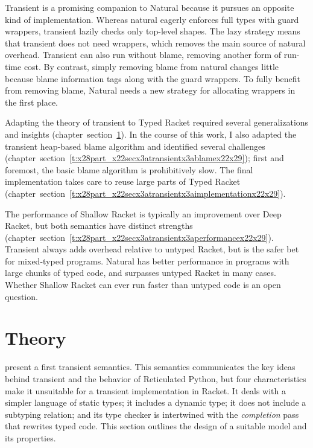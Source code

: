 \documentclass[ twoside,open=right,titlepage,numbers=noenddot,headinclude,%
                footinclude=true,cleardoublepage=empty,abstract=off,
                BCOR=5mm,paper=a4,fontsize=11pt,%
                ngerman,american,%
                parts,pdfspacing]{scrreprt}
\newcommand{\SecRef}[2]{section~#1}
\newcommand{\SecRefLocal}[3]{\hyperref[#1]{\SecRef{#2}{#3}}}
\let\SOriginalthesubsubsection\thesubsubsection
\newcommand{\Ssubsection}[2]{\subsection[#1]{#2}\let\thesubsubsection\SOriginalthesubsubsection}
\renewcommand{\Ssubsection}[2]{\section[#1]{#2}}
\renewcommand{\SecRefLocal}[3]{section~\ref{#1}}
\begin{document}
Transient is a promising companion to Natural because it pursues an
 opposite kind of implementation.
Whereas natural eagerly enforces full types with guard wrappers, transient
 lazily checks only top{-}level shapes.
The lazy strategy means that transient does not need wrappers, which removes
 the main source of natural overhead.
Transient can also run without blame, removing another form of run{-}time cost.
By contrast, simply removing blame from natural changes little because
 blame information tags along with the guard wrappers.
To fully benefit from removing blame, Natural needs a new strategy for allocating wrappers in
 the first place.

Adapting the theory of transient to Typed Racket required
 several generalizations and insights (chapter~\SecRefLocal{t:x28part_x22secx3atransientx3atheoryx22x29}{5.1}{Theory}).
In the course of this work, I also adapted the transient heap{-}based blame
 algorithm and identified several challenges (chapter~\SecRefLocal{t:x28part_x22secx3atransientx3ablamex22x29}{5.2}{Work{-}in{-}progress: Blame});
 first and foremost, the basic blame algorithm is prohibitively slow.
The final implementation takes care to reuse large parts of Typed Racket
 (chapter~\SecRefLocal{t:x28part_x22secx3atransientx3aimplementationx22x29}{5.3}{Implementation}).

The performance of Shallow Racket is typically an improvement over
 Deep Racket, but both semantics have distinct strengths (chapter~\SecRefLocal{t:x28part_x22secx3atransientx3aperformancex22x29}{5.4}{Performance}).
Transient always adds overhead relative to untyped Racket, but is the
 safer bet for mixed{-}typed programs.
Natural has better performance in programs with large chunks of typed
 code, and surpasses untyped Racket in many cases.
Whether Shallow Racket can ever run faster than untyped code is an open
 question.

\Ssubsection{Theory}{Theory}\label{t:x28part_x22secx3atransientx3atheoryx22x29}

 present a first transient semantics.
This semantics communicates the key ideas behind transient and
 the behavior of Reticulated Python, but four characteristics make it
 unsuitable for a transient implementation in Racket.
It deals with a simpler language of static types;
 it includes a dynamic type;
 it does not include a subtyping relation;
 and its type checker is intertwined with the \emph{completion} pass
 that rewrites typed code.
This section outlines the design of a suitable model and its properties.
\end{document}
